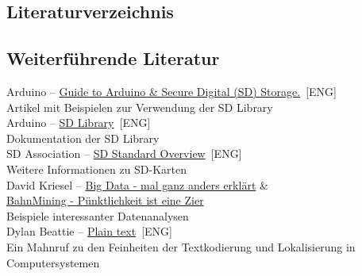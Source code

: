 \documentclass[ngerman]{schoolPres}
\begin{document}
  \subsection{Literaturverzeichnis}%
  \begin{frame}
    \printbibliography[heading=none]
  \end{frame}

  \subsection{Weiterführende Literatur}%
  \begin{frame}

    Arduino -- \href{https://docs.arduino.cc/learn/programming/sd-guide}{Guide to Arduino \& Secure Digital (SD) Storage.}~[ENG]\\
    \vspace{-.5ex}\hspace{1em} {\footnotesize Artikel mit Beispielen zur Verwendung der SD Library}\\

    \vspace{.5ex}Arduino -- \href{hhttps://www.arduino.cc/reference/en/libraries/sd/}{SD Library}~[ENG]\\
    \vspace{-.5ex}\hspace{1em} {\footnotesize Dokumentation der SD Library}\\

    \vspace{.5ex}SD Association -- \href{https://www.sdcard.org/developers/}{SD Standard Overview}~[ENG]\\
    \vspace{-.5ex}\hspace{1em} {\footnotesize Weitere Informationen zu SD-Karten}\\

    \vspace{.5ex}David Kriesel -- \href{https://youtu.be/\_Pd5sXXMMLI}{Big Data - mal ganz anders erklärt} \& \\ \href{https://youtu.be/0rb9CfOvojk}{BahnMining - Pünktlichkeit ist eine Zier}\\
    \vspace{-.5ex}\hspace{1em} {\footnotesize Beispiele interessanter Datenanalysen}\\

    \vspace{.2ex}Dylan Beattie -- \href{https://youtu.be/gd5uJ7Nlvvo}{Plain text}~[ENG]\\
    \vspace{-.2ex}\hspace{1em} {\footnotesize Ein Mahnruf zu den Feinheiten der Textkodierung und Lokalisierung in Computersystemen}
  \end{frame}
\end{document}
